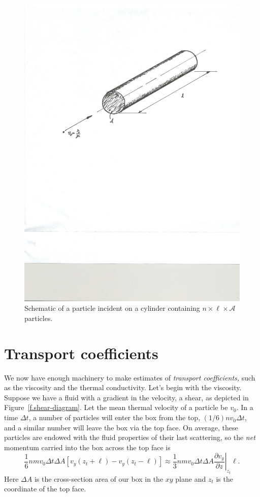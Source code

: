 \begin{figure}[htbp]
\includegraphics[width=\textwidth]{Figures/mean-free-path}
\caption{Schematic of a particle incident on a cylinder containing $n\times\ell\times\mathcal{A}$ particles.}
\label{f.mfp}
\end{figure}

\section{Transport coefficients}

We now have enough machinery to make estimates of \emph{transport coefficients,} such as the viscosity and the thermal conductivity. Let's begin with the viscosity.  Suppose we have a fluid with a gradient in the velocity, a shear, as depicted in Figure~\ref{f.shear-diagram}.  Let the mean thermal velocity of a particle be $v_{0}$.  In a time $\Delta t$, a number of particles will enter the box from the top, $(1/6) n v_{0} \Delta t$, and a similar number will leave the box via the top face. On average, these particles are endowed with the fluid properties of their last scattering, so the \emph{net} momentum carried into the box across the top face is
\begin{equation}\label{e.viscosity-1}
 \frac{1}{6} n m v_{0} \Delta t \Delta A \left[v_{y}(z_{t} + \ell) - v_{y}(z_{t}-\ell)\right] \approx \frac{1}{3} n m v_{0} \Delta t\Delta A \left.\frac{\partial v_{y}}{\partial z}\right|_{z_{t}}\ell.
\end{equation}
Here $\Delta A$ is the cross-section area of our box in the $xy$ plane and $z_{t}$ is the coordinate of the top face.

